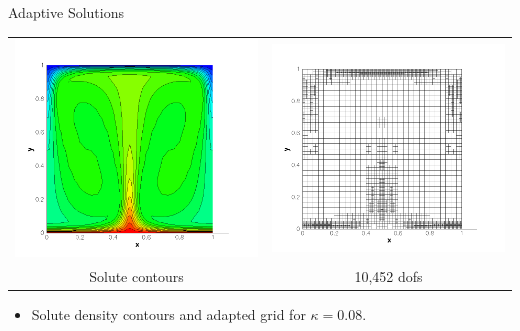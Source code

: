 \documentclass[compress,12pt]{beamer}
\begin{document}
\begin{frame}{Adaptive Solutions}
  {
    \begin{center}
      \begin{tabular}{cc} \\
	\includegraphics[width=.5\textwidth]{figures/s_adapt_kappa_0_08}&
	\includegraphics[width=.5\textwidth]{figures/grid_adapt_kappa_0_08}\\
	Solute contours &
	10,452 dofs
      \end{tabular}\end{center}
    \begin{itemize}
      
    \item Solute density contours and adapted grid for $\kappa=0.08$.
    \end{itemize}
  }


\end{frame}
\end{document}
